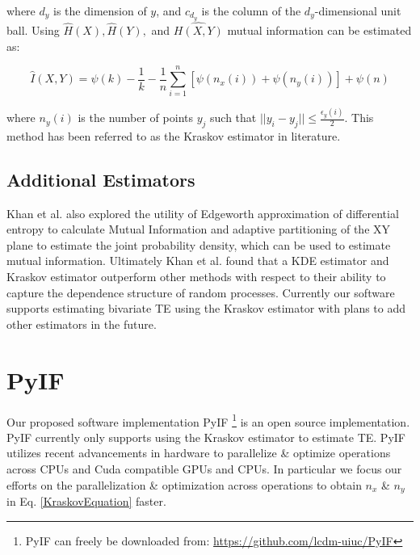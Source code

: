 \documentclass[conference]{IEEEtran}
\begin{document}

\noindent where \(d_y\) is the dimension of \(y\), and \(c_{d_y}\) is the column of the \(d_y\)-dimensional unit ball. Using \(\hat{H}(X), \hat{H}(Y),\) and \(\hat{H(X,Y)}\) mutual information can be estimated as:

\begin{equation}
\label{KraskovEquation}
\hat{I}(X,Y) = \psi(k) - \frac{1}{k} - \frac{1}{n}  \sum_{i=1}^n [\psi(n_x(i)) + \psi(n_y(i))] + \psi(n)
\end{equation}

\noindent where \(n_y(i)\) is the number of points \(y_j\) such that \(|| y_i - y_j || \leq \frac{\epsilon_y(i)}{2} \). This method has been referred to as the Kraskov estimator in literature.

\subsection{Additional Estimators}
Khan et al. also explored the utility of Edgeworth approximation of differential entropy to calculate Mutual Information and adaptive partitioning of the XY plane to estimate the joint probability density, which can be used to estimate mutual information. Ultimately Khan et al. found that a KDE estimator and Kraskov estimator outperform  other methods  with respect to their ability to capture the dependence structure of random processes. Currently our software supports estimating bivariate TE using the Kraskov estimator with plans to add other estimators in the future.

\section{PyIF}

Our proposed software implementation PyIF \footnote{PyIF can freely be downloaded from: \url{https://github.com/lcdm-uiuc/PyIF}} is an open source implementation. PyIF currently only supports using the Kraskov estimator to estimate TE. PyIF utilizes recent advancements in hardware to parallelize \& optimize operations across CPUs and Cuda compatible GPUs \cite{CUDA} and CPUs. In particular we focus our efforts on the parallelization \& optimization across operations to obtain \(n_x\)  \& \(n_y\) in Eq. \ref{KraskovEquation} faster.
\end{document}
